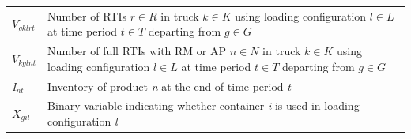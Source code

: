 \begin{longtable}[hbt!]{  |p{}|p{}  |}
  $V_{gklrt}$                                                                                    & Number of RTIs $r\in R$ in truck $k\in K$ using loading configuration $l\in L$ at time period $t\in T$ departing from $g\in G$                                                                                                                                                                                                                                                                                                                                                                                                                                                 \\
  $V_{kglnt}$                                                                                    & Number of full RTIs with RM or AP $n\in N$ in truck $k\in K$ using loading configuration $l\in L$ at time period $t\in T$ departing from $g\in G$                                                                                                                                                                                                                                                                                                                                                                                                                              \\
  \textit{I$_{nt}$}                                                                              & Inventory of product \textit{n} at the end of  time period  \textit{t}                                                                                                                                                                                                                                                                                                                                                                                                                                                                                                         \\[0.15cm]
  \textit{$X_{gil}$}                                                                             & Binary variable indicating whether container \textit{i} is used in loading configuration \textit{l}                                                                                                                                                                                                                                                                                                                                                                                                                                                                            \\[0.15cm]

\end{longtable}

